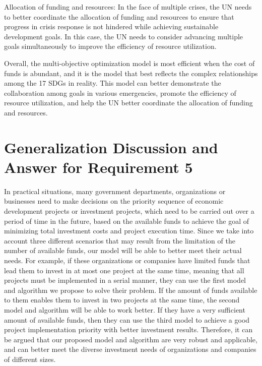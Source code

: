 \documentclass[10pt]{mcmthesis}
\begin{document}
Allocation of funding and resources: In the face of multiple crises, the UN needs to better coordinate the allocation of funding and resources to ensure that progress in crisis response is not hindered while achieving sustainable development goals. In this case, the UN needs to consider advancing multiple goals simultaneously to improve the efficiency of resource utilization.

Overall, the multi-objective optimization model is most efficient when the cost of funds is abundant, and it is the model that best reflects the complex relationships among the 17 SDGs in reality. This model can better demonstrate the collaboration among goals in various emergencies, promote the efficiency of resource utilization, and help the UN better coordinate the allocation of funding and resources.

\section{Generalization Discussion and Answer for Requirement 5}
In practical situations, many government departments, organizations or businesses need to make decisions on the priority sequence of economic development projects or investment projects, which need to be carried out over a period of time in the future, based on the available funds to achieve the goal of minimizing total investment costs and project execution time. Since we take into account three different scenarios that may result from the limitation of the number of available funds, our model will be able to better meet their actual needs. For example, if these organizations or companies have limited funds that lead them to invest in at most one project at the same time, meaning that all projects must be implemented in a serial manner, they can use the first model and algorithm we propose to solve their problem.  If the amount of funds available to them enables them to invest in two projects at the same time, the second model and algorithm will be able to work better. If they have a very sufficient amount of available funds, then they can use the third model to achieve a good project implementation priority with better investment results. Therefore, it can be argued that our proposed model and algorithm are very robust and applicable, and can better meet the diverse investment needs of organizations and companies of different sizes.
\end{document}
